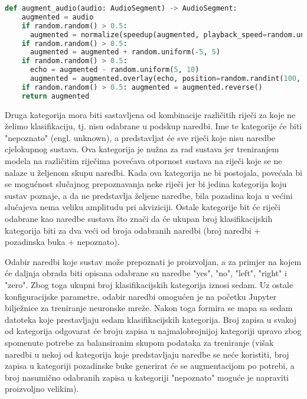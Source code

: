 \begin{lstlisting}[language=Python, caption=Augmentacija zvuka, label=code:augmentation]
def augment_audio(audio: AudioSegment) -> AudioSegment:
    augmented = audio
    if random.random() > 0.5:
      augmented = normalize(speedup(augmented, playback_speed=random.uniform(1.1, 1.5)))
    if random.random() > 0.5:
      augmented = augmented + random.uniform(-5, 5)
    if random.random() > 0.5:
      echo = augmented - random.uniform(5, 10) 
      augmented = augmented.overlay(echo, position=random.randint(100, 500))
    if random.random() > 0.5: augmented = augmented.reverse()
    return augmented
\end{lstlisting}


Druga kategorija mora biti sastavljena od kombinacije različitih riječi za koje
ne želimo klasifikaciju, tj. nisu odabrane u podskup naredbi. Ime te kategorije
će biti "nepoznato" (engl. unknown), a predstavljat će sve riječi koje nisu
naredbe cjelokupnog sustava. Ova kategorija je nužna za rad sustava jer 
treniranjem modela na različitim riječima povećava otpornost sustava na riječi
koje se ne nalaze u željenom skupu naredbi. Kada ova kategorija ne bi postojala,
povećala bi se mogućnost slučajnog prepoznavanja neke riječi jer bi jedina kategorija
koju sustav poznaje, a da ne predstavlja željene naredbe, bila pozadina koja
u većini slučajeva nema veliku amplitudu pri akviziciji. 
Ostale kategorije bit će riječi odabrane kao naredbe
sustava što  znači da će ukupan broj klasifikacijskih kategorija biti za dva veći 
od broja odabranih naredbi (broj naredbi + pozadinska buka + nepoznato).

Odabir naredbi koje sustav može prepoznati je proizvoljan, a za primjer na kojem
će daljnja obrada biti opisana odabrane su naredbe "yes", "no", "left", "right" i 
"zero". Zbog toga ukupni broj
klasifikacijskih kategorija iznosi sedam. Uz ostale konfiguracijske parametre,
odabir naredbi omogućen je na početku Jupyter bilježnice za treniranje neuronske mreže.
Nakon toga formira se mapa sa sedam datoteka koje prestavljaju sedam klasifikacijskih
kategorija.
Broj zapisa u svakoj od kategorija odgovarat će broju zapisa u najmalobrojnijoj 
kategoriji upravo zbog spomenute potrebe za balansiranim skupom podataka za treniranje
(višak naredbi u nekoj od kategorija koje predstavljaju naredbe se neće koristiti, broj
zapisa u kategoriji pozadinske buke generirat će se augmentacijom po potrebi, a broj
nasumično odabranih zapisa u kategoriji "nepoznato" moguće je napraviti proizvoljno
velikim).

